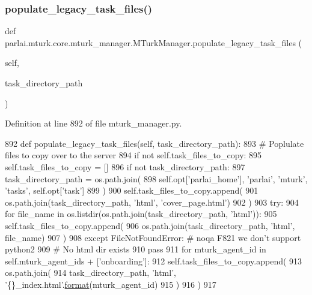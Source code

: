 \subsubsection{\texorpdfstring{populate\+\_\+legacy\+\_\+task\+\_\+files()}{populate\_legacy\_task\_files()}}
{\footnotesize\ttfamily def parlai.\+mturk.\+core.\+mturk\+\_\+manager.\+M\+Turk\+Manager.\+populate\+\_\+legacy\+\_\+task\+\_\+files (\begin{DoxyParamCaption}\item[{}]{self,  }\item[{}]{task\+\_\+directory\+\_\+path }\end{DoxyParamCaption})}



Definition at line 892 of file mturk\+\_\+manager.\+py.


\begin{DoxyCode}
892     \textcolor{keyword}{def }populate\_legacy\_task\_files(self, task\_directory\_path):
893         \textcolor{comment}{# Poplulate files to copy over to the server}
894         \textcolor{keywordflow}{if} \textcolor{keywordflow}{not} self.task\_files\_to\_copy:
895             self.task\_files\_to\_copy = []
896         \textcolor{keywordflow}{if} \textcolor{keywordflow}{not} task\_directory\_path:
897             task\_directory\_path = os.path.join(
898                 self.opt[\textcolor{stringliteral}{'parlai\_home'}], \textcolor{stringliteral}{'parlai'}, \textcolor{stringliteral}{'mturk'}, \textcolor{stringliteral}{'tasks'}, self.opt[\textcolor{stringliteral}{'task'}]
899             )
900         self.task\_files\_to\_copy.append(
901             os.path.join(task\_directory\_path, \textcolor{stringliteral}{'html'}, \textcolor{stringliteral}{'cover\_page.html'})
902         )
903         \textcolor{keywordflow}{try}:
904             \textcolor{keywordflow}{for} file\_name \textcolor{keywordflow}{in} os.listdir(os.path.join(task\_directory\_path, \textcolor{stringliteral}{'html'})):
905                 self.task\_files\_to\_copy.append(
906                     os.path.join(task\_directory\_path, \textcolor{stringliteral}{'html'}, file\_name)
907                 )
908         \textcolor{keywordflow}{except} FileNotFoundError:  \textcolor{comment}{# noqa F821 we don't support python2}
909             \textcolor{comment}{# No html dir exists}
910             \textcolor{keywordflow}{pass}
911         \textcolor{keywordflow}{for} mturk\_agent\_id \textcolor{keywordflow}{in} self.mturk\_agent\_ids + [\textcolor{stringliteral}{'onboarding'}]:
912             self.task\_files\_to\_copy.append(
913                 os.path.join(
914                     task\_directory\_path, \textcolor{stringliteral}{'html'}, \textcolor{stringliteral}{'\{\}\_index.html'}.\hyperlink{namespaceparlai_1_1chat__service_1_1services_1_1messenger_1_1shared__utils_a32e2e2022b824fbaf80c747160b52a76}{format}(mturk\_agent\_id)
915                 )
916             )
917 
\end{DoxyCode}
